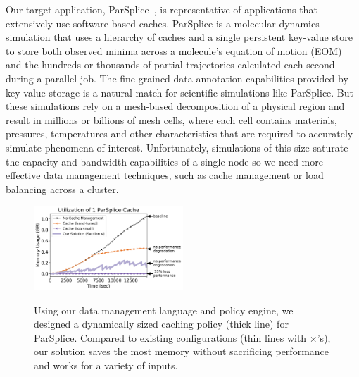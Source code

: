 Our target application, ParSplice~\cite{perez:jctc20150parsplice}, is
representative of applications that extensively use software-based caches.
ParSplice is a molecular dynamics simulation that uses a hierarchy of caches
and a single persistent key-value store to store both observed minima across a
molecule's equation of motion (EOM) and the hundreds or thousands of partial
trajectories calculated each second during a parallel job.  The fine-grained
data annotation capabilities provided by key-value storage is a natural match
for scientific simulations like ParSplice. But these simulations rely on a
mesh-based decomposition of a physical region and result in millions or
billions of mesh cells, where each cell contains materials, pressures,
temperatures and other characteristics that are required to accurately simulate
phenomena of interest.  Unfortunately, simulations of this size saturate the
capacity and bandwidth capabilities of a single node so we need more effective
data management techniques, such as cache management or load balancing across a
cluster.

\begin{figure}[t]
\noindent\includegraphics[width=0.5\textwidth]{figures/cache-management.png}\\
\caption{Using our data management language and policy engine, we designed a
dynamically sized caching policy (thick line) for ParSplice.  Compared to
existing configurations (thin lines with \(\times\)'s), our solution saves the most
memory without sacrificing performance and works for a variety of inputs.
\label{fig:cache-management}}
\end{figure}

